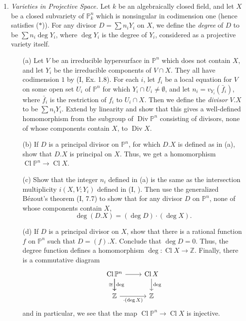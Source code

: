 \documentclass{article}
\newcommand{\PP}{\mathbb{P}}
\newcommand{\Z}{\mathbb{Z}}
\DeclareMathOperator{\cl}{Cl}
\DeclareMathOperator{\Div}{Div}
\begin{document}
\begin{enumerate} [label=\textbf{\arabic*.}, leftmargin=0em]
\item \textit{Varieties in Projective Space.} Let $k$ be an algebraically closed field, and let $X$ be a closed subvariety of $\PP_k^n$ which is nonsingular in codimension one (hence satisfies ($*$)). For any divisor $D = \sum n_i Y_i$ on $X$, we define the \textit{degree} of $D$ to be $\sum n_i \deg Y_i$, where $\deg Y_i$ is the degree of $Y_i$, considered as a projective variety itself.
\begin{itemize}
    \item[(a)] Let $V$ be an irreducible hypersurface in $\PP^n$ which does not contain $X$, and let $Y_i$ be the irreducible components of $V \cap X$. They all have codimension $1$ by (I, Ex. 1.8). For each $i$, let $f_i$ be a local equation for $V$ on some open set $U_i$ of $\PP^n$ for which $Y_i \cap U_i \neq \emptyset$, and let $n_i = v_{Y_i}(\bar{f}_i)$, where $\bar{f}_i$ is the restriction of $f_i$ to $U_i \cap X$. Then we define the \textit{divisor} $V.X$ to be $\sum n_i Y_i$. Extend by linearity and show that this gives a well-defined homomorphism from the subgroup of $\Div \PP^n$ consisting of divisors, none of whose components contain $X$, to $\Div X$.
    \item[(b)] If $D$ is a principal divisor on $\PP^n$, for which $D.X$ is defined as in (a), show that $D.X$ is principal on $X$. Thus, we get a homomorphism $\cl\PP^n \to \cl X$.
    \item[(c)] Show that the integer $n_i$ defined in (a) is the same as the intersection multiplicity $i(X, V; Y_i)$ defined in (I, ). Then use the generalized Bézout's theorem (I, 7.7) to show that for any divisor $D$ on $\PP^n$, none of whose components contain $X$,
    \begin{equation*}
        \deg(D.X) = (\deg D) \cdot (\deg X).
    \end{equation*}
    \item[(d)] If $D$ is a principal divisor on $X$, show that there is a rational function $f$ on $\PP^n$ such that $D = (f).X$. Conclude that $\deg D = 0$. Thus, the degree function defines a homomorphism $\deg : \cl X \to \Z$. Finally, there is a commutative diagram
    \[\begin{tikzcd}
        \cl \PP^n \arrow[r] \arrow[d, "\cong"'] \arrow[d, "\deg "] & \cl X \arrow[d, "\deg"] \\
        \Z \arrow[r, "\cdot(\deg X)"']                                  & \Z                                 
        \end{tikzcd} \]
    and in particular, we see that the map $\cl \PP^n \to \cl X$ is injective.
\end{itemize}


\end{enumerate}
\end{document}
